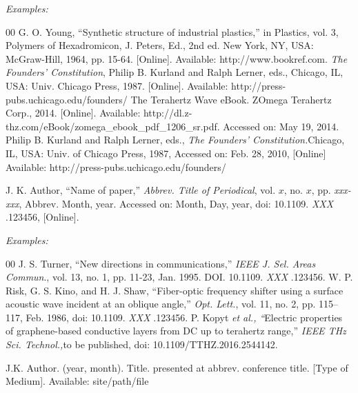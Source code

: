 \documentclass{ieeetj}
\begin{document}
{\it Examples:}

\begin{thebibliography}{00}
 G. O. Young, ``Synthetic structure of industrial plastics,'' in Plastics, vol. 3, Polymers of Hexadromicon, J. Peters, Ed., 2nd ed. New York, NY, USA: McGraw-Hill, 1964, pp. 15-64. [Online]. Available:  {http://www.bookref.com}.
 {\it The Founders' Constitution}, Philip B. Kurland and Ralph Lerner, eds., Chicago, IL, USA: Univ. Chicago Press, 1987. [Online]. Available:  {http://press-pubs.uchicago.edu/founders/}
 The Terahertz Wave eBook. ZOmega Terahertz Corp., 2014. [Online]. Available:  {http://dl.z-thz.com/eBook/zomega\_ebook\_pdf\_1206\_sr.pdf}. Accessed on: May 19, 2014.
 Philip B. Kurland and Ralph Lerner, eds., {\it The Founders' Constitution.}Chicago, IL, USA: Univ. of Chicago Press, 1987, Accessed on: Feb. 28, 2010, [Online] Available:  {http://press-pubs.uchicago.edu/founders/}
\end{thebibliography}


\noindent J. K. Author, ``Name of paper,'' {\it Abbrev. Title of Periodical}, vol. $x$, no. $x$, pp. {\it xxx-xxx}, Abbrev. Month, year.
Accessed on: Month, Day, year, doi:  {10.1109.} {{\it
XXX}} {.123456}, [Online].

{\it Examples:}

\begin{thebibliography}{00}
 J. S. Turner, ``New directions in communications,'' {\it IEEE J. Sel. Areas Commun}., vol. 13, no. 1, pp. 11-23, Jan. 1995. DOI.  {10.1109.} {{\it XXX}} {.123456}.
 W. P. Risk, G. S. Kino, and H. J. Shaw, ``Fiber-optic frequency shifter using a surface acoustic wave incident at an oblique angle,'' {\it Opt. Lett.}, vol. 11, no. 2, pp. 115--117, Feb. 1986, doi: {10.1109.} {{\it XXX}} {.123456}.
 P. Kopyt {\it \textit{et al.}, ``}Electric properties of graphene-based conductive layers from DC up to terahertz range,'' {\it IEEE THz Sci. Technol.,}to be published, doi:  {10.1109/TTHZ.2016.2544142}.
\end{thebibliography}


\noindent J.K. Author. (year, month). Title. presented at abbrev. conference title.
[Type of Medium]. Available: site/path/file
\end{document}
